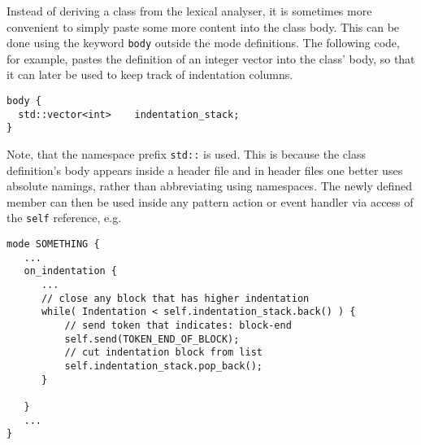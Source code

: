 Instead of deriving a class from the lexical analyser, it is sometimes more
convenient to simply paste some more content into the class body. This can be
done using the keyword {\tt body} outside the mode definitions. The following
code, for example, pastes the definition of an integer vector into the class'
body, so that it can later be used to keep track of indentation columns.

\begin{lstlisting}
body {
  std::vector<int>    indentation_stack;
}
\end{lstlisting}

Note, that the namespace prefix {\tt std::} is used. This is because the class
definition's body appears inside a header file and in header files one better
uses absolute namings, rather than abbreviating using namespaces. The newly
defined member can then be used inside any pattern action or event handler via
access of the {\tt self} reference, e.g.

\begin{lstlisting}
mode SOMETHING {
   ...
   on_indentation {
      ...
      // close any block that has higher indentation
      while( Indentation < self.indentation_stack.back() ) {
          // send token that indicates: block-end
          self.send(TOKEN_END_OF_BLOCK);
          // cut indentation block from list
          self.indentation_stack.pop_back();
      }
      
   }
   ...
}
\end{lstlisting}

